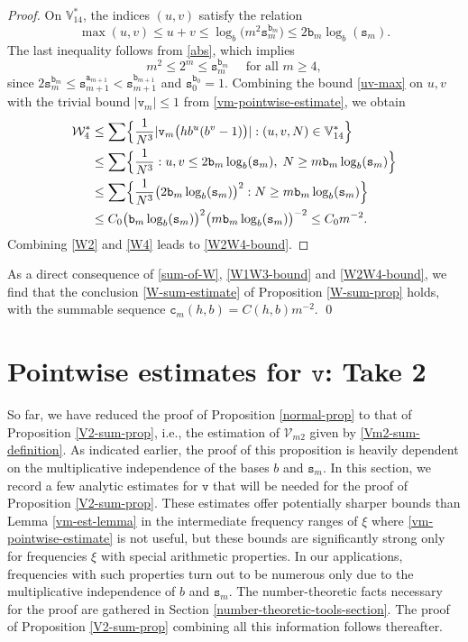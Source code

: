 \documentclass[12pt, twoside]{article}
\theoremstyle{definition}
\numberwithin{equation}{section}
\begin{document}
\begin{proof}
On $\mathbb V_{14}^{\ast}$, the indices $(u, v)$ satisfy the relation
\begin{equation}  \max(u, v) \leq u + v \leq \log_b\bigl(m^2 \mathtt s_m^{\mathtt b_m}\bigr) \leq 2 \mathtt b_m \log_b (\mathtt s_m). \label{uv-max} \end{equation} 
The last inequality follows from \eqref{abs}, which implies \[ m^2 \leq 2^{m} \leq \mathtt s_m^{\mathtt b_m} \quad \text{ for all } m \geq 4,  \] since $2\mathtt s_m^{\mathtt b_m} \leq \mathtt s_{m+1}^{\mathtt a_{m+1}} <\mathtt s_{m+1}^{\mathtt b_{m+1} }$ and $\mathtt s_{0}^{\mathtt b_{0} } = 1$. Combining the bound \eqref{uv-max} on $u, v$ with the trivial bound $|\mathtt v_m| \leq 1$ from \eqref{vm-pointwise-estimate}, we obtain 
\begin{align} 
\mathcal W_4^{\ast} &\leq \sum \Bigl\{\frac{1}{N^3}|\mathtt v_m \bigl(hb^u(b^v-1) \bigr)| : (u, v, N) \in \mathbb V_{14}^{\ast}  \Bigr\} \nonumber \\
&\leq \sum \Bigl\{\frac{1}{N^3} : u, v \leq 2\mathtt b_m \log_b (\mathtt s_m), \;  N \geq m \mathtt b_m \log_b (\mathtt s_m) \Bigr\} \nonumber \\ 
&\leq \sum \Bigl\{ \frac{1}{N^3}  \bigl(2\mathtt b_m \log_b (\mathtt s_m) \bigr)^2 : N \geq m \mathtt b_m \log_b (\mathtt s_m) \Bigr\} \nonumber \\
&\leq C_0  \bigl( \mathtt b_m \log_b (\mathtt s_m) \bigr)^2 \bigl(  m \mathtt b_m \log_b (\mathtt s_m) \bigr)^{-2} \leq C_0 m^{-2}.  \label{W4}
\end{align}    
Combining \eqref{W2} and \eqref{W4} leads to \eqref{W2W4-bound}. 
\end{proof} 
\noindent As a direct consequence of \eqref{sum-of-W}, \eqref{W1W3-bound} and \eqref{W2W4-bound}, we find that the conclusion \eqref{W-sum-estimate} of Proposition \ref{W-sum-prop} holds, with the summable sequence $\mathtt c_m(h,b) = C(h,b) m^{-2}$.
 \qed


\section{Pointwise estimates for $\mathtt v$: Take 2} \label{v-pointwise-section-take-2} 
So far, we have reduced the proof of Proposition \ref{normal-prop} to that of Proposition \ref{V2-sum-prop}, i.e., the estimation of $\mathcal V_{m2}$ given by \eqref{Vm2-sum-definition}. As indicated earlier, the proof of this proposition is heavily dependent on the multiplicative independence of the bases $b$ and $\mathtt s_m$. In this section, we record a few analytic estimates for $\mathtt v$ that will be needed for the proof of Proposition \ref{V2-sum-prop}. These estimates offer potentially sharper bounds than Lemma \ref{vm-est-lemma} in the intermediate frequency ranges of $\xi$ where \eqref{vm-pointwise-estimate} is not useful, but these bounds are significantly strong only for frequencies $\xi$ with special arithmetic properties. In our applications, frequencies with such properties turn out to be numerous only due to the multiplicative independence of $b$ and $\mathtt s_m$. The number-theoretic facts necessary for the proof are gathered in Section \ref{number-theoretic-tools-section}. The proof of Proposition \ref{V2-sum-prop} combining all this information follows thereafter.  
\end{document}
